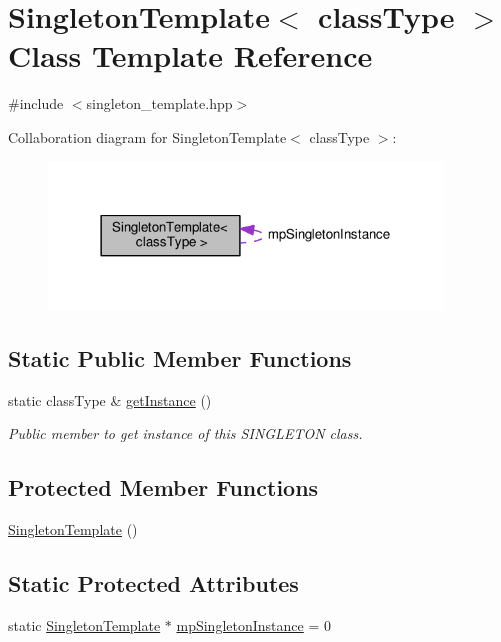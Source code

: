 \hypertarget{classSingletonTemplate}{}\section{Singleton\+Template$<$ class\+Type $>$ Class Template Reference}
\label{classSingletonTemplate}


{\ttfamily \#include $<$singleton\+\_\+template.\+hpp$>$}



Collaboration diagram for Singleton\+Template$<$ class\+Type $>$\+:\nopagebreak
\begin{figure}[H]
\begin{center}
\leavevmode
\includegraphics[width=297pt]{df/d9b/classSingletonTemplate__coll__graph}
\end{center}
\end{figure}
\subsection*{Static Public Member Functions}
\begin{DoxyCompactItemize}
\item 
static class\+Type \& \hyperlink{classSingletonTemplate_a2851636dbc6132ae2d803b9c6c55414e}{get\+Instance} ()
\begin{DoxyCompactList}\small\item\em Public member to get instance of this S\+I\+N\+G\+L\+E\+T\+ON class. \end{DoxyCompactList}\end{DoxyCompactItemize}
\subsection*{Protected Member Functions}
\begin{DoxyCompactItemize}
\item 
\hyperlink{classSingletonTemplate_adfc866be065799c9f77d139c2bcb36cf}{Singleton\+Template} ()
\end{DoxyCompactItemize}
\subsection*{Static Protected Attributes}
\begin{DoxyCompactItemize}
\item 
static \hyperlink{classSingletonTemplate}{Singleton\+Template} $\ast$ \hyperlink{classSingletonTemplate_ad710f0bce00d17f5a3915ddaa6c4108b}{mp\+Singleton\+Instance} = 0
\end{DoxyCompactItemize}


